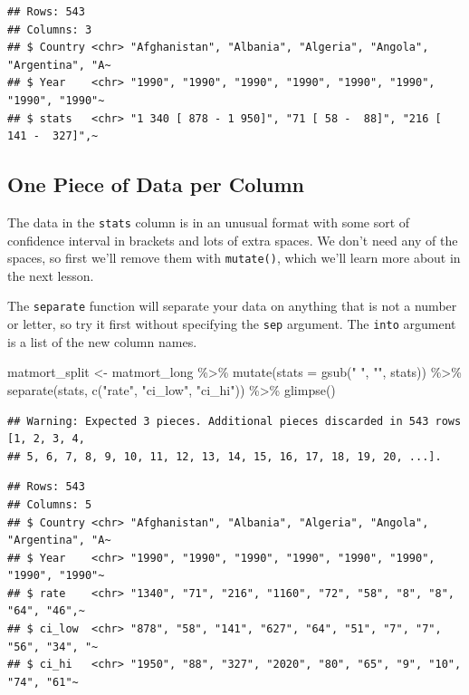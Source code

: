 \documentclass[
  oneside]{book}
\newenvironment{Shaded}{\begin{snugshade}}{\end{snugshade}}
\newcommand{\AttributeTok}[1]{\textcolor[rgb]{0.77,0.63,0.00}{#1}}
\newcommand{\FunctionTok}[1]{\textcolor[rgb]{0.00,0.00,0.00}{#1}}
\newcommand{\NormalTok}[1]{#1}
\newcommand{\OtherTok}[1]{\textcolor[rgb]{0.56,0.35,0.01}{#1}}
\newcommand{\SpecialCharTok}[1]{\textcolor[rgb]{0.00,0.00,0.00}{#1}}
\newcommand{\StringTok}[1]{\textcolor[rgb]{0.31,0.60,0.02}{#1}}
\begin{document}
\begin{verbatim}
## Rows: 543
## Columns: 3
## $ Country <chr> "Afghanistan", "Albania", "Algeria", "Angola", "Argentina", "A~
## $ Year    <chr> "1990", "1990", "1990", "1990", "1990", "1990", "1990", "1990"~
## $ stats   <chr> "1 340 [ 878 - 1 950]", "71 [ 58 -  88]", "216 [ 141 -  327]",~
\end{verbatim}

\hypertarget{one-piece-of-data-per-column}{%
\subsection{One Piece of Data per Column}\label{one-piece-of-data-per-column}}

The data in the \texttt{stats} column is in an unusual format with some sort of confidence interval in brackets and lots of extra spaces. We don't need any of the spaces, so first we'll remove them with \texttt{mutate()}, which we'll learn more about in the next lesson.

The \texttt{separate} function will separate your data on anything that is not a number or letter, so try it first without specifying the \texttt{sep} argument. The \texttt{into} argument is a list of the new column names.

\begin{Shaded}
\begin{Highlighting}[]
\NormalTok{matmort\_split }\OtherTok{\textless{}{-}}\NormalTok{ matmort\_long }\SpecialCharTok{\%\textgreater{}\%}
  \FunctionTok{mutate}\NormalTok{(}\AttributeTok{stats =} \FunctionTok{gsub}\NormalTok{(}\StringTok{" "}\NormalTok{, }\StringTok{""}\NormalTok{, stats)) }\SpecialCharTok{\%\textgreater{}\%}
  \FunctionTok{separate}\NormalTok{(stats, }\FunctionTok{c}\NormalTok{(}\StringTok{"rate"}\NormalTok{, }\StringTok{"ci\_low"}\NormalTok{, }\StringTok{"ci\_hi"}\NormalTok{)) }\SpecialCharTok{\%\textgreater{}\%}
  \FunctionTok{glimpse}\NormalTok{()}
\end{Highlighting}
\end{Shaded}

\begin{verbatim}
## Warning: Expected 3 pieces. Additional pieces discarded in 543 rows [1, 2, 3, 4,
## 5, 6, 7, 8, 9, 10, 11, 12, 13, 14, 15, 16, 17, 18, 19, 20, ...].
\end{verbatim}

\begin{verbatim}
## Rows: 543
## Columns: 5
## $ Country <chr> "Afghanistan", "Albania", "Algeria", "Angola", "Argentina", "A~
## $ Year    <chr> "1990", "1990", "1990", "1990", "1990", "1990", "1990", "1990"~
## $ rate    <chr> "1340", "71", "216", "1160", "72", "58", "8", "8", "64", "46",~
## $ ci_low  <chr> "878", "58", "141", "627", "64", "51", "7", "7", "56", "34", "~
## $ ci_hi   <chr> "1950", "88", "327", "2020", "80", "65", "9", "10", "74", "61"~
\end{verbatim}
\end{document}
